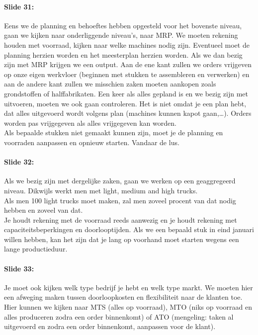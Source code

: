 \documentclass[10pt,a4paper]{report}
\begin{document}
\paragraph{Slide 31:} Eens we de planning en behoeftes hebben opgesteld voor het bovenste niveau, gaan we kijken naar onderliggende niveau's, naar MRP. We moeten rekening houden met voorraad, kijken naar welke machines nodig zijn. Eventueel moet de planning herzien worden en het meesterplan herzien worden. Als we dan bezig zijn met MRP krijgen we een output. Aan de ene kant zullen we orders vrijgeven op onze eigen werkvloer (beginnen met stukken te assembleren en verwerken) en aan de andere kant zullen we misschien zaken moeten aankopen zoals grondstoffen of halffabrikaten. Een keer als alles gepland is en we bezig zijn met uitvoeren, moeten we ook gaan controleren. Het is niet omdat je een plan hebt, dat alles uitgevoerd wordt volgens plan (machines kunnen kapot gaan,…). Orders worden pas vrijgegeven als alles vrijgegeven kan worden.\\
Als bepaalde stukken niet gemaakt kunnen zijn, moet je de planning en voorraden aanpassen en opnieuw starten. Vandaar de lus.

\paragraph{Slide 32:} Als we bezig zijn met dergelijke zaken, gaan we werken op een geaggregeerd niveau. Dikwijls werkt men met light, medium and high trucks.\\
Als men 100 light trucks moet maken, zal men zoveel procent van dat nodig hebben en zoveel van dat.\\
Je houdt rekening met de voorraad reeds aanwezig en je houdt rekening met capaciteitsbeperkingen en doorlooptijden. Als we een bepaald stuk in eind januari willen hebben, kan het zijn dat je lang op voorhand moet starten wegens een lange productieduur. 

\paragraph{Slide 33:} Je moet ook kijken welk type bedrijf je hebt en welk type markt. We moeten hier een afweging maken tussen doorloopkosten en flexibiliteit naar de klanten toe. Hier kunnen we kijken naar MTS (alles op voorraad), MTO (niks op voorraad en alles produceren zodra een order binnenkomt) of ATO (mengeling: taken al uitgevoerd en zodra een order binnenkomt, aanpassen voor de klant).
\end{document}
